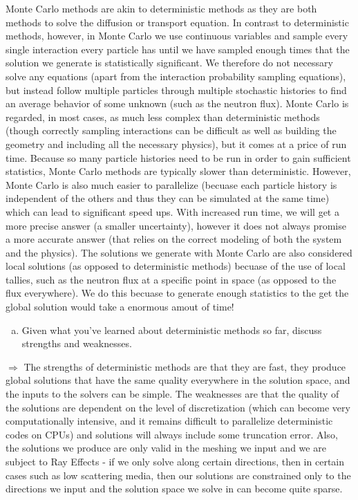 \documentclass[10pt]{article}
\begin{document}
Monte Carlo methods are akin to deterministic methods as they are both methods to solve the diffusion or transport equation. In contrast to deterministic methods, however, in Monte Carlo we use continuous variables and sample every single interaction every particle has until we have sampled enough times that the solution we generate is statistically significant. We therefore do not necessary solve any equations (apart from the interaction probability sampling equations), but instead follow multiple particles through multiple stochastic histories to find an average behavior of some unknown (such as the neutron flux). Monte Carlo is regarded, in most cases, as much less complex than deterministic methods (though correctly sampling interactions can be difficult as well as building the geometry and including all the necessary physics), but it comes at a price of run time. Because so many particle histories need to be run in order to gain sufficient statistics, Monte Carlo methods are typically slower than deterministic. However, Monte Carlo is also much easier to parallelize (becuase each particle history is independent of the others and thus they can be simulated at the same time) which can lead to significant speed ups. With increased run time, we will get a more precise answer (a smaller uncertainty), however it does not always promise a more accurate answer (that relies on the correct modeling of both the system and the physics). The solutions we generate with Monte Carlo are also considered local solutions (as opposed to deterministic methods) becuase of the use of local tallies, such as the neutron flux at a specific point in space (as opposed to the flux everywhere). We do this becuase to generate enough statistics to the get the global solution would take a enormous amout of time!\\




\begin{enumerate}[(b)]
    \item Given what you've learned about deterministic methods so far, discuss strengths and weaknesses.\\[-5pt]
\end{enumerate}

$\Rightarrow$ The strengths of deterministic methods are that they are fast, they produce global solutions that have the same quality everywhere in the solution space, and the inputs to the solvers can be simple. The weaknesses are that the quality of the solutions are dependent on the level of discretization (which can become very computationally intensive, and it remains difficult to parallelize deterministic codes on CPUs) and solutions will always include some truncation error. Also, the solutions we produce are only valid in the meshing we input and we are subject to Ray Effects - if we only solve along certain directions, then in certain cases such as low scattering media, then our solutions are constrained only to the directions we input and the solution space we solve in can become quite sparse.
\end{document}
